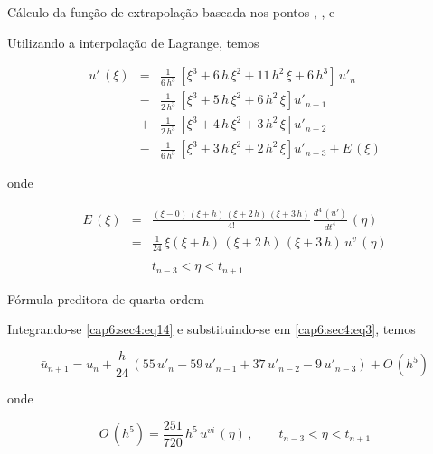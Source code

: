 \begin{enumerar}

\item Cálculo da função de extrapolação  baseada nos pontos , ,  e 

Utilizando a interpolação de Lagrange, temos

\begin{eqnarray}
 u' \, (\xi) & = & \frac{1}{6 \, h^3} \, \left[ \xi^3 + 6 \, h \, \xi^2 + 11 \, h^2 \, \xi + 6 \, h^3 \right] \, u'_n \nonumber \\
 & - & \frac{1}{2 \, h^3} \, \left[ \xi^3 + 5 \, h \, \xi^2 + 6 \, h^2 \, \xi \right] u'_{n-1} \nonumber \\
 & + & \frac{1}{2 \, h^3} \, \left[ \xi^3 + 4 \, h \, \xi^2 + 3 \, h^2 \, \xi \right] u'_{n-2} \nonumber \\
 \label{cap6:sec4:eq14}
 & - & \frac{1}{6 \, h^3} \, \left[ \xi^3 + 3 \, h \, \xi^2 + 2 \, h^2 \, \xi \right] u'_{n-3} + E \, (\xi)
\end{eqnarray}

onde

\begin{eqnarray}
 E \, (\xi) & = & \frac{(\xi -0) \, (\xi + h) \, (\xi + 2 \, h) \, (\xi + 3 \, h)}{4!} \, \frac{d^4 \, (u')}{dt^4} \, (\eta) \nonumber \\
 \label{cap6:sec4:eq15}
 & = & \frac{1}{24} \, \xi (\xi + h) \, (\xi + 2 \, h) \, (\xi + 3 \, h) \, u^v \, (\eta) \\
 \nonumber \\
 & & t_{n-3} < \eta < t_{n+1} \nonumber
\end{eqnarray}

\item Fórmula preditora de quarta ordem

Integrando-se \ref{cap6:sec4:eq14} e substituindo-se em \ref{cap6:sec4:eq3}, temos

\begin{equation}
 \label{cap6:sec4:eq16}
 \bar{u}_{n+1} = u_n + \frac{h}{24} \, (55 \, u'_n - 59 \, u'_{n-1} + 37 \, u'_{n-2} - 9 \, u'_{n-3}) + O \, (h^5)
\end{equation}

onde

\begin{equation}
 \label{cap6:sec4:eq17}
 O \, (h^5) = \frac{251}{720} \, h^5 \, u^{vi} \, (\eta) \, , \qquad t_{n-3} < \eta < t_{n+1}
\end{equation}


\end{enumerar}

